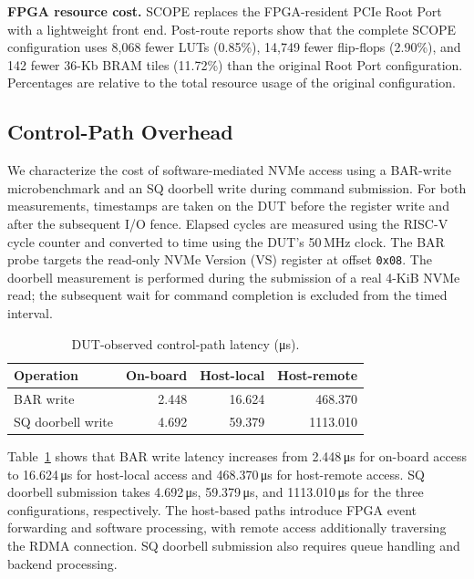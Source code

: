 \noindent\textbf{FPGA resource cost.}
SCOPE replaces the FPGA-resident PCIe Root Port with a lightweight front end.
Post-route reports show that the complete SCOPE configuration uses 8,068 fewer
LUTs (0.85\%), 14,749 fewer flip-flops (2.90\%), and 142 fewer 36-Kb BRAM tiles
(11.72\%) than the original Root Port configuration. Percentages are relative
to the total resource usage of the original configuration.



\subsection{Control-Path Overhead}

We characterize the cost of software-mediated NVMe access using a BAR-write
microbenchmark and an SQ doorbell write during command submission. For both
measurements, timestamps are taken on the DUT before the register write and
after the subsequent I/O fence. Elapsed cycles are measured using the RISC-V
cycle counter and converted to time using the DUT's 50\,MHz clock. The BAR
probe targets the read-only NVMe Version (VS) register at offset \texttt{0x08}.
The doorbell measurement is performed during the submission of a real 4-KiB
NVMe read; the subsequent wait for command completion is excluded from the
timed interval.

\begin{table}[t]
\centering
\caption{DUT-observed control-path latency (\si{\micro\second}).}
\label{tab:control}
\small
\setlength{\tabcolsep}{3pt}
\begin{tabularx}{\columnwidth}{@{}Xrrr@{}}
\toprule
Operation & On-board & Host-local & Host-remote \\
\midrule
BAR write & 2.448 & 16.624 & 468.370 \\
SQ doorbell write & 4.692 & 59.379 & 1113.010 \\
\bottomrule
\end{tabularx}
\end{table}

Table~\ref{tab:control} shows that BAR write latency increases from
2.448\,\si{\micro\second} for on-board access to 16.624\,\si{\micro\second}
for host-local access and 468.370\,\si{\micro\second} for host-remote access.
SQ doorbell submission takes 4.692\,\si{\micro\second},
59.379\,\si{\micro\second}, and 1113.010\,\si{\micro\second} for the three
configurations, respectively. The host-based paths introduce FPGA event
forwarding and software processing, with remote access additionally traversing
the RDMA connection. SQ doorbell submission also requires queue handling and
backend processing.


